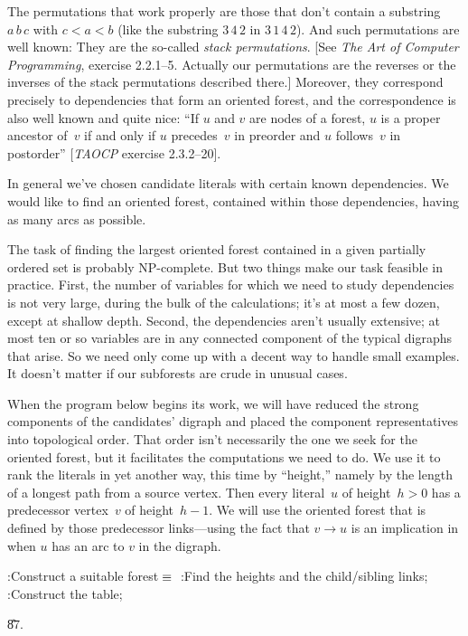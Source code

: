 The permutations that work properly are those that don't contain a
substring $a\,b\,c$ with $c<a<b$ (like the substring $3\,4\,2$ in
$3\,1\,4\,2$). And such permutations are well known: They are the so-called
{\it stack permutations\/}. [See {\sl The Art of Computer Programming},
exercise 2.2.1--5. Actually our permutations are the reverses or the
inverses of the stack permutations described there.] Moreover, they correspond
precisely to dependencies that form an oriented forest, and the correspondence
is also well known and quite nice: ``If $u$ and $v$ are nodes of a forest,
$u$ is a proper ancestor of~$v$ if and only if $u$ precedes~$v$ in
preorder and $u$ follows~$v$ in postorder'' [{\sl TAOCP\/} exercise
2.3.2--20].

In general we've chosen candidate literals with certain known dependencies.
We would like to find an oriented forest, contained within those
dependencies, having as many arcs as possible.

The task of finding the largest oriented forest contained in a given
partially ordered set is probably NP-complete.
But two things make our task feasible in practice.
First, the number of variables for which we need to study dependencies
is not very large, during the bulk of the calculations; it's at most a
few dozen, except at shallow depth. Second, the dependencies aren't usually
extensive; at most ten or so variables are in any connected component of the
typical digraphs that arise. So we need only come up with a decent way to
handle small examples. It doesn't matter if our subforests are crude
in unusual cases.

\fi

When the program below begins its work, we will have reduced the
strong components of the candidates' digraph and placed the component
representatives into topological order. That order isn't necessarily
the one we seek for the oriented forest, but it facilitates the
computations we need to do. We use it to rank the literals in yet
another way, this time by ``height,'' namely by
the length of a longest path from a source vertex.
Then every literal~$u$ of height~$h>0$ has a predecessor vertex~$v$
of height~$h-1$. We will use the oriented forest that is defined by those
predecessor links---using the fact that $v\to u$ is an implication
in  when $u$ has an arc to $v$ in the 
digraph.

\Y\B\4:Construct a suitable forest\X${}\equiv{}$\6
:Find the heights and the child/sibling links\X;\6
:Construct the  table\X;\par
\U87.\fi

